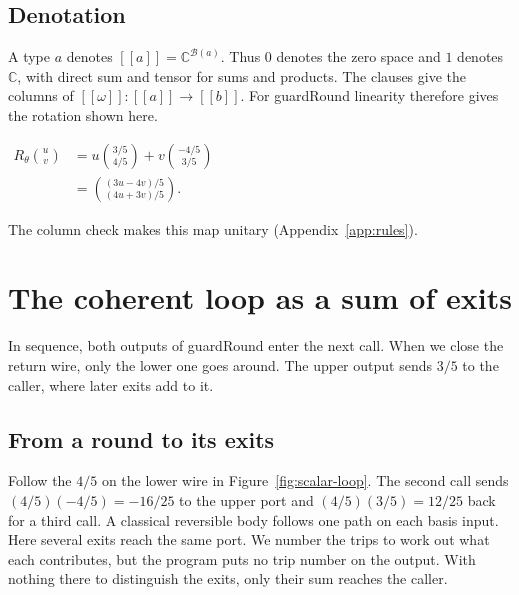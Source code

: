 \documentclass[acmsmall,screen,review,anonymous,nonacm]{acmart}
\newcommand{\C}{\mathbb C}
\newcommand{\storyinlineface}{\small\ttfamily}
\newcommand{\code}[1]{\textnormal{\storyinlineface #1}}
\providecommand{\llbracket}{[\![}
\providecommand{\rrbracket}{]\!]}
\newcommand{\sem}[1]{\llbracket #1 \rrbracket}
\numberwithin{equation}{section}
\begin{document}
\subsection{Denotation}
\par\smallskip\noindent\begin{minipage}[c]{0.46\linewidth}
A type $a$ denotes $\sem a=\C^{\mathcal B(a)}$. Thus $0$ denotes the zero space and $1$
denotes $\C$, with direct sum and tensor for sums and products. The clauses give the columns of
$\sem\omega:\sem a\to\sem b$. For \code{guardRound} linearity therefore gives the rotation shown here.
\end{minipage}\hfill\begin{minipage}[c]{0.52\linewidth}\centering
$\displaystyle \begin{aligned} R_\theta\binom uv
  &=u\binom{3/5}{4/5}+v\binom{-4/5}{3/5}\\
  &=\binom{(3u-4v)/5}{(4u+3v)/5}.\end{aligned}$
\end{minipage}\par\smallskip
The column check makes this map unitary (Appendix~\ref{app:rules}).

\section{The coherent loop as a sum of exits}\label{sec:trace}
In sequence, both outputs of \code{guardRound} enter the next call. When we close the return wire, only the lower one goes around. The upper output sends $3/5$ to the caller, where later exits add to it.

\subsection{From a round to its exits}

Follow the $4/5$ on the lower wire in Figure~\ref{fig:scalar-loop}.
The second call sends $(4/5)(-4/5)=-16/25$ to the upper port and
$(4/5)(3/5)=12/25$ back for a third call. A classical reversible body follows one path on each basis input.
Here several exits reach the same port. We number the trips to work out what each contributes, but the program puts no trip number on the output. With nothing there to distinguish the exits, only their sum reaches the caller.
\end{document}
